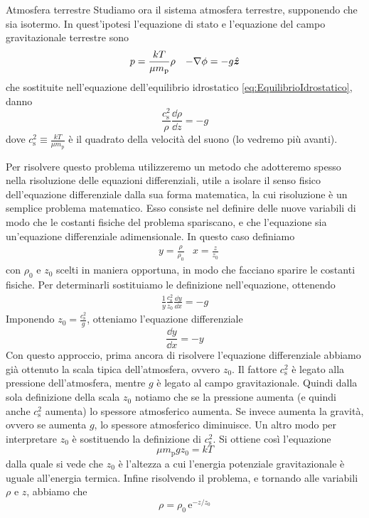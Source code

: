 \begin{Example}{Atmosfera terrestre}
Studiamo ora il sistema atmosfera terrestre, supponendo che sia isotermo. In quest'ipotesi l'equazione di stato e l'equazione del campo gravitazionale terrestre sono
\begin{align*}
& p=\frac{kT}{\mu m_\mathrm{p}}\rho 
& -\V{\nabla}\phi = -g \V{\hat{z}}
\end{align*}
che sostituite nell'equazione dell'equilibrio idrostatico \ref{eq:EquilibrioIdrostatico}, danno
\begin{equation}
\frac{c_\mathrm{s}^2}{\rho}\frac{\dd \rho}{\dd z}=-g
\end{equation}
dove $c_\mathrm{s}^2 \equiv \frac{kT}{\mu m_\mathrm{p}}$ è il quadrato della velocità del suono (lo vedremo più avanti).

Per risolvere questo problema utilizzeremo un metodo che adotteremo spesso nella risoluzione delle equazioni differenziali, utile a isolare il senso fisico dell'equazione differenziale dalla sua forma matematica, la cui risoluzione è un semplice problema matematico. Esso consiste nel definire delle nuove variabili di modo che le costanti fisiche del problema spariscano, e che l'equazione sia un'equazione differenziale adimensionale. In questo caso definiamo
\begin{align*}
& y=\frac{\rho}{\rho_0}
& x=\frac{z}{z_0}
\end{align*}
con $\rho_0$ e $z_0$ scelti in maniera opportuna, in modo che facciano sparire le costanti fisiche. Per determinarli sostituiamo le definizione nell'equazione, ottenendo
\begin{align*}
\frac{1}{y}\frac{c_\mathrm{s}^2}{z_0}\frac{\dd y}{\dd x}=-g
\end{align*}
Imponendo $z_0=\frac{c_\mathrm{s}^2}{g}$, otteniamo l'equazione differenziale
\begin{equation}
\frac{\dd y}{\dd x} = -y
\end{equation}
Con questo approccio, prima ancora di risolvere l'equazione differenziale abbiamo già ottenuto la scala tipica dell'atmosfera, ovvero $z_0$. Il fattore $c_\mathrm{s}^2$ è legato alla pressione dell'atmosfera, mentre $g$ è legato al campo gravitazionale. Quindi dalla sola definizione della scala $z_0$ notiamo che se la pressione aumenta (e quindi anche $c_\mathrm{s}^2$ aumenta) lo spessore atmosferico aumenta. Se invece aumenta la gravità, ovvero se aumenta $g$, lo spessore atmosferico diminuisce. Un altro modo per interpretare $z_0$ è sostituendo la definizione di $c_\mathrm{s}^2$. Si ottiene così l'equazione
\begin{equation}
\mu m_\mathrm{p} g z_0 = kT
\end{equation}
dalla quale si vede che $z_0$ è l'altezza a cui l'energia potenziale gravitazionale è uguale all'energia termica.
Infine risolvendo il problema, e tornando alle variabili $\rho$ e $z$, abbiamo che
\begin{equation}
\rho = \rho_0 \,\mathrm{e}^{-z/z_0}
\end{equation}
\end{Example} 

